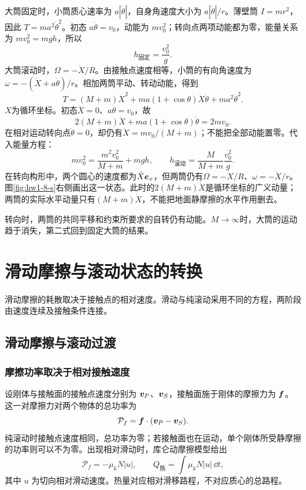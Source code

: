 \begin{solution}
大筒固定时，小筒质心速率为 $a|\dot\theta|$，自身角速度大小为 $a|\dot\theta|/r$。薄壁筒 $I=mr^2$，因此 $T=ma^2\dot\theta^2$。初态 $a\dot\theta=v_0$，动能为 $mv_0^2$；转向点两项动能都为零，能量关系为 $mv_0^2=mgh$，所以
\[
 \boxed{h_{\text{固定}}=\frac{v_0^2}{g}}.
\]
大筒滚动时，$\Omega=-\dot X/R$。由接触点速度相等，小筒的有向角速度为 $\omega=-(\dot X+a\dot\theta)/r$。相加两筒平动、转动动能，得到
\[
 T=(M+m)\dot X^2+ma(1+\cos\theta)\dot X\dot\theta
 +ma^2\dot\theta^2.
\]
$X$为循环坐标。初态$\dot X=0$、$a\dot\theta=v_0$，故
\[
 2(M+m)\dot X+ma(1+\cos\theta)\dot\theta=2mv_0.
\]
在相对运动转向点$\dot\theta=0$，却仍有$\dot X=mv_0/(M+m)$；不能把全部动能置零。代入能量方程：
\[
 mv_0^2=\frac{m^2v_0^2}{M+m}+mgh,
 \qquad\boxed{h_{\text{滚动}}=\frac{M}{M+m}\frac{v_0^2}{g}}.
\]
在转向构形中，两个圆心的速度都为$\dot X\bm{e}_x$，但两筒仍有$\Omega=-\dot X/R$、$\omega=-\dot X/r$。图\ref{fig:hw1-8-s}右侧画出这一状态。此时的$2(M+m)\dot X$是循环坐标的广义动量；两筒的实际水平动量只有$(M+m)\dot X$，不能把地面静摩擦的水平作用删去。

转向时，两筒的共同平移和约束所要求的自转仍有动能。$M\to\infty$时，大筒的运动趋于消失，第二式回到固定大筒的结果。


\end{solution}



\section{滑动摩擦与滚动状态的转换}

滑动摩擦的耗散取决于接触点的相对速度。滑动与纯滚动采用不同的方程，两阶段由速度连续及接触条件连接。



\subsection{滑动摩擦与滚动过渡}
\subsubsection{摩擦功率取决于相对接触速度}
设刚体与接触面的接触点速度分别为 $\bm{v}_P$、$\bm{v}_S$，接触面施于刚体的摩擦力为 $\bm{f}$。这一对摩擦力对两个物体的总功率为
\[
\mathcal P_f=\bm{f}\cdot(\bm{v}_P-\bm{v}_S).
\]
纯滚动时接触点速度相同，总功率为零；若接触面也在运动，单个刚体所受静摩擦的功率则可以不为零。出现相对滑动时，库仑动摩擦模型给出
\begin{equation}\label{sup1:eq:d1-dissipation}
\mathcal P_f=-\mu_kN|u|,\qquad
Q_{\text{热}}=\int\mu_kN|u|\,\dd t,
\end{equation}
其中 $u$ 为切向相对滑动速度。热量对应相对滑移路程，不对应质心的总路程。

